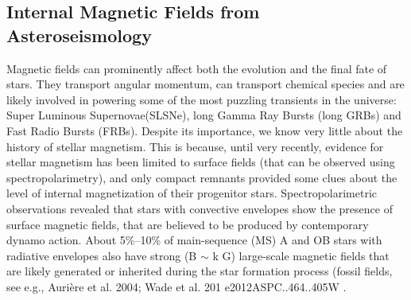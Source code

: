 {\color{red}\subsection{Internal Magnetic Fields from Asteroseismology}}
Magnetic fields can prominently affect both the evolution and the final fate of stars. They transport angular momentum, can transport chemical species
and are likely involved in powering some of the most puzzling transients in the universe: Super Luminous Supernovae(SLSNe), long Gamma Ray Bursts (long GRBs) and Fast Radio Bursts (FRBs). 
Despite its importance, we know very little about the history of stellar magnetism. This is  because, until very recently, 
evidence for stellar magnetism has been limited to surface fields (that can be observed using spectropolarimetry),
and only compact remnants provided some clues about the level of internal magnetization of their progenitor stars.
Spectropolarimetric observations revealed that stars with convective envelopes show the presence of
surface magnetic fields, that are believed to be produced by contemporary dynamo action.
About 5\%–10\% of main-sequence (MS) A and OB stars with radiative envelopes also have strong (B $\sim$ k G)
large-scale magnetic fields that are likely generated or inherited during the star
formation process (fossil fields, see e.g., Aurière et al. 2004; Wade et al. 201 e{2012ASPC..464..405W} . 
